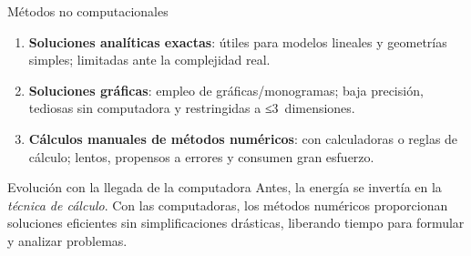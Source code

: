 \documentclass[main.tex]{subfiles}
\begin{document}
\begin{frame}[c]{Métodos no computacionales}
\begin{enumerate}
  \item \textbf{Soluciones analíticas exactas}: útiles para modelos lineales y geometrías simples; limitadas ante la complejidad real.
  \item \textbf{Soluciones gráficas}: empleo de gráficas/monogramas; baja precisión, tediosas sin computadora y restringidas a ≤3~dimensiones.
  \item \textbf{Cálculos manuales de métodos numéricos}: con calculadoras o reglas de cálculo; lentos, propensos a errores y consumen gran esfuerzo.
\end{enumerate}

\begin{block}{Evolución con la llegada de la computadora}
\medskip
Antes, la energía se invertía en la \emph{técnica de cálculo}. Con las computadoras, los métodos numéricos proporcionan soluciones eficientes sin simplificaciones drásticas, liberando tiempo para formular y analizar problemas.
\end{block}
\end{frame}
\end{document}

